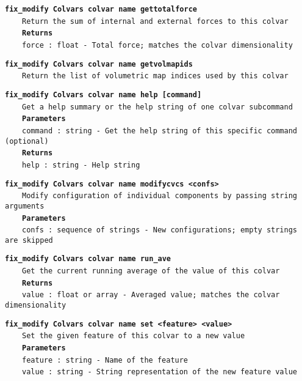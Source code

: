 \begin{mdexampleinput}{}
\texttt{\textbf{fix\_modify Colvars colvar name gettotalforce}}
\\
\-~~~~\texttt{Return the sum of internal and external forces to this colvar}
\\
\-~~~~\texttt{\textbf{Returns}}
\\
\-~~~~\texttt{force : float - Total force; matches the colvar dimensionality}
\end{mdexampleinput}
\begin{mdexampleinput}{}
\texttt{\textbf{fix\_modify Colvars colvar name getvolmapids}}
\\
\-~~~~\texttt{Return the list of volumetric map indices used by this colvar}
\end{mdexampleinput}
\begin{mdexampleinput}{}
\texttt{\textbf{fix\_modify Colvars colvar name help [command]}}
\\
\-~~~~\texttt{Get a help summary or the help string of one colvar subcommand}
\\
\-~~~~\texttt{\textbf{Parameters}}
\\
\-~~~~\texttt{command : string - Get the help string of this specific command (optional)}
\\
\-~~~~\texttt{\textbf{Returns}}
\\
\-~~~~\texttt{help : string - Help string}
\end{mdexampleinput}
\begin{mdexampleinput}{}
\texttt{\textbf{fix\_modify Colvars colvar name modifycvcs <confs>}}
\\
\-~~~~\texttt{Modify configuration of individual components by passing string arguments}
\\
\-~~~~\texttt{\textbf{Parameters}}
\\
\-~~~~\texttt{confs : sequence of strings - New configurations; empty strings are skipped}
\end{mdexampleinput}
\begin{mdexampleinput}{}
\texttt{\textbf{fix\_modify Colvars colvar name run\_ave}}
\\
\-~~~~\texttt{Get the current running average of the value of this colvar}
\\
\-~~~~\texttt{\textbf{Returns}}
\\
\-~~~~\texttt{value : float or array - Averaged value; matches the colvar dimensionality}
\end{mdexampleinput}
\begin{mdexampleinput}{}
\texttt{\textbf{fix\_modify Colvars colvar name set <feature> <value>}}
\\
\-~~~~\texttt{Set the given feature of this colvar to a new value}
\\
\-~~~~\texttt{\textbf{Parameters}}
\\
\-~~~~\texttt{feature : string - Name of the feature}
\\
\-~~~~\texttt{value : string - String representation of the new feature value}
\end{mdexampleinput}
